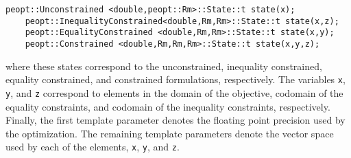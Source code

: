 \begin{lstlisting}[style=C++]
    peopt::Unconstrained <double,peopt::Rm>::State::t state(x);
    peopt::InequalityConstrained<double,Rm,Rm>::State::t state(x,z);
    peopt::EqualityConstrained <double,Rm,Rm>::State::t state(x,y);
    peopt::Constrained <double,Rm,Rm,Rm>::State::t state(x,y,z);
\end{lstlisting}
where these states correspond to the unconstrained, inequality constrained, equality constrained, and constrained formulations, respectively.  The variables \texttt{x}, \texttt{y}, and \texttt{z} correspond to elements in the domain of the objective, codomain of the equality constraints, and codomain of the inequality constraints, respectively.  Finally, the first template parameter denotes the floating point precision used by the optimization.  The remaining template parameters denote the vector space used by each of the elements, \texttt{x}, \texttt{y}, and \texttt{z}. 
